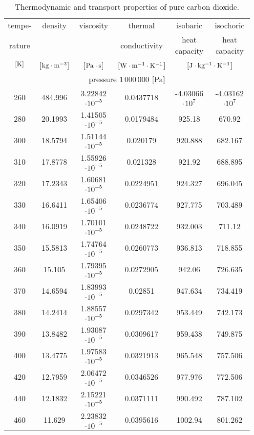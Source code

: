 \begin{table}
\caption{\label{tab-annex-b}Thermodynamic and transport properties of pure carbon dioxide.}
\begin{center}
\scriptsize
\begin{tabular}{cccccc}
\toprule
tempe-		& density	& viscosity		& thermal 				& isobaric 					& isochoric \\
rature		&			&				& conductivity			& heat capacity				& heat capacity\\
$[\unit[]{K}]$	&[$\unit[]{kg \cdot m^{-3}}$]		& [$\unit[]{Pa \cdot s}$]   & [$\unit[]{W \cdot m^{-1} \cdot K^{-1}}$] & \multicolumn{2}{c}{[$\unit[]{J \cdot kg^{-1} \cdot K^{-1}}$]} \\
\midrule
\multicolumn{6}{c}{pressure 1\,000\,000 [Pa]}\\
260	&	484.996	&	3.22842 $ \cdot 10^{-5}$	&	0.0437718	&	-4.03066 $ \cdot 10^{7}$	&	-4.03162 $ \cdot 10^{7}$	\\
280	&	20.1993	&	1.41505 $ \cdot 10^{-5}$	&	0.0179484	&	925.18	&	670.92	\\
300	&	18.5794	&	1.51144 $ \cdot 10^{-5}$	&	0.020179	&	920.888	&	682.167	\\
310	&	17.8778	&	1.55926 $ \cdot 10^{-5}$	&	0.021328	&	921.92	&	688.895	\\
320	&	17.2343	&	1.60681 $ \cdot 10^{-5}$	&	0.0224951	&	924.327	&	696.045	\\
330	&	16.6411	&	1.65406 $ \cdot 10^{-5}$	&	0.0236774	&	927.775	&	703.489	\\
340	&	16.0919	&	1.70101 $ \cdot 10^{-5}$	&	0.0248722	&	932.003	&	711.12	\\
350	&	15.5813	&	1.74764 $ \cdot 10^{-5}$	&	0.0260773	&	936.813	&	718.855	\\
360	&	15.105	&	1.79395 $ \cdot 10^{-5}$	&	0.0272905	&	942.06	&	726.635	\\
370	&	14.6594	&	1.83993 $ \cdot 10^{-5}$	&	0.02851	&	947.634	&	734.419	\\
380	&	14.2414	&	1.88557 $ \cdot 10^{-5}$	&	0.0297342	&	953.449	&	742.173	\\
390	&	13.8482	&	1.93087 $ \cdot 10^{-5}$	&	0.0309617	&	959.438	&	749.875	\\
400	&	13.4775	&	1.97583 $ \cdot 10^{-5}$	&	0.0321913	&	965.548	&	757.506	\\
420	&	12.7959	&	2.06472 $ \cdot 10^{-5}$	&	0.0346526	&	977.976	&	772.506	\\
440	&	12.1832	&	2.15221 $ \cdot 10^{-5}$	&	0.0371111	&	990.492	&	787.102	\\
460	&	11.629	&	2.23832 $ \cdot 10^{-5}$	&	0.0395616	&	1002.94	&	801.262	\\

\end{tabular}
\end{center}
\end{table}
